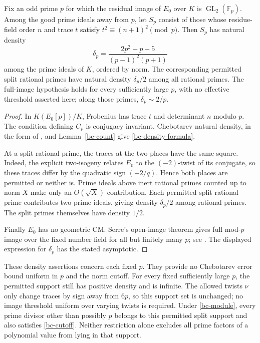 \begin{theorem}\label{bc-density}
Fix an odd prime $p$ for which the residual image of $E_0$ over $K$
is $\operatorname{GL}_2(\mathbb F_p)$. Among the good prime ideals
away from $p$, let $S_p$ consist of those whose residue-field order
$n$ and trace $t$ satisfy $t^2\equiv(n+1)^2\pmod p$.
Then $S_p$ has natural density
\begin{equation}\label{bc-density-formula}
 \delta_p=\frac{2p^2-p-5}{(p-1)^2(p+1)}
\end{equation}
among the prime ideals of $K$, ordered by norm. The corresponding
permitted split rational primes have natural density $\delta_p/2$
among all rational primes. The full-image hypothesis holds for every
sufficiently large $p$, with no effective threshold asserted here;
along those primes, $\delta_p\sim2/p$.
\end{theorem}
\begin{proof}
In $K(E_0[p])/K$, Frobenius has trace $t$ and determinant $n$ modulo
$p$. The condition defining $C_p$ is conjugacy invariant. Chebotarev
natural density, in the form of \cite[Definition~8.30 and
Theorem~8.31]{MilneANT2020}, and Lemma~\ref{bc-count} give
\eqref{bc-density-formula}.

At a split rational prime, the traces at the two places have the same
square. Indeed, the explicit two-isogeny relates $E_0$ to the
$(-2)$-twist of its conjugate, so these traces differ by the quadratic
sign $(-2/q)$. Hence both places are permitted or neither is.
Prime ideals above inert rational primes counted up to norm $X$ make
only an $O(\sqrt X)$ contribution. Each permitted split rational
prime contributes two prime ideals, giving density $\delta_p/2$
among rational primes. The split primes themselves have density $1/2$.

Finally $E_0$ has no geometric CM. Serre's open-image theorem gives
full mod-$p$ image over the fixed number field for all but finitely
many $p$; see \cite[pp.~259--260, assertions (3), (6), (7)]{Serre1972OpenImage}.
The displayed expression for $\delta_p$ has the stated asymptotic.
\end{proof}

These density assertions concern each fixed $p$. They provide no
Chebotarev error bound uniform in $p$ and the norm cutoff. For every
fixed sufficiently large $p$, the permitted support still has positive
density and is infinite. The allowed twists $\nu$ only change traces
by sign away from $6p$, so this support set is unchanged; no image
threshold uniform over varying twists is required. Under
\eqref{bc-module}, every prime divisor other than possibly $p$ belongs
to this permitted split support and also satisfies \eqref{bc-cutoff}.
Neither restriction alone excludes all prime factors of a polynomial
value from lying in that support.

